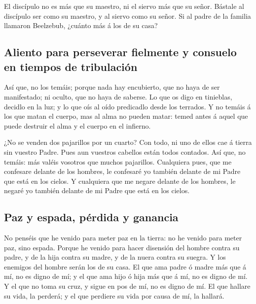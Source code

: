  El discípulo no es más que su maestro, ni el siervo más
que su señor.  Bástale al discípulo ser como su maestro,
y al siervo como su señor. Si al padre de la familia llamaron Beelzebub,
¿cuánto más á los de su casa?

\hypertarget{aliento-para-perseverar-fielmente-y-consuelo-en-tiempos-de-tribulaciuxf3n}{%
\subsection{Aliento para perseverar fielmente y consuelo en tiempos de
tribulación}\label{aliento-para-perseverar-fielmente-y-consuelo-en-tiempos-de-tribulaciuxf3n}}

 Así que, no los temáis; porque nada hay encubierto, que
no haya de ser manifestado; ni oculto, que no haya de saberse.
 Lo que os digo en tinieblas, decidlo en la luz; y lo que
oís al oído predicadlo desde los terrados.  Y no temáis á
los que matan el cuerpo, mas al alma no pueden matar: temed antes á
aquel que puede destruir el alma y el cuerpo en el infierno.

 ¿No se venden dos pajarillos por un cuarto? Con todo, ni
uno de ellos cae á tierra sin vuestro Padre.  Pues aun
vuestros cabellos están todos contados.  Así que, no
temáis: más valéis vosotros que muchos pajarillos. 
Cualquiera pues, que me confesare delante de los hombres, le confesaré
yo también delante de mi Padre que está en los cielos.  Y
cualquiera que me negare delante de los hombres, le negaré yo también
delante de mi Padre que está en los cielos.

\hypertarget{paz-y-espada-puxe9rdida-y-ganancia}{%
\subsection{Paz y espada, pérdida y
ganancia}\label{paz-y-espada-puxe9rdida-y-ganancia}}

 No penséis que he venido para meter paz en la tierra: no
he venido para meter paz, sino espada.  Porque he venido
para hacer disensión del hombre contra su padre, y de la hija contra su
madre, y de la nuera contra su suegra.  Y los enemigos
del hombre serán los de su casa.  El que ama padre ó
madre más que á mí, no es digno de mí; y el que ama hijo ó hija más que
á mí, no es digno de mí.  Y el que no toma su cruz, y
sigue en pos de mí, no es digno de mí.  El que hallare su
vida, la perderá; y el que perdiere su vida por causa de mí, la hallará.

